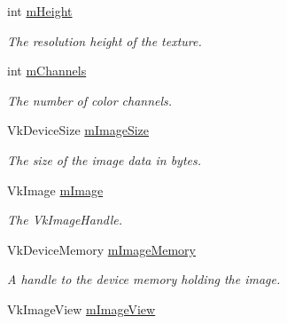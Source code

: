 \begin{DoxyCompactItemize}
\mbox{\label{class_texture_ad7078e03c0ef6e69b733eb85fd72aec2}} 
int \mbox{\hyperlink{class_texture_ad7078e03c0ef6e69b733eb85fd72aec2}{m\+Height}}
\begin{DoxyCompactList}\small\item\em The resolution height of the texture. \end{DoxyCompactList}\item 
\mbox{\label{class_texture_a45ab34f201e8555b754d643e842324cf}} 
int \mbox{\hyperlink{class_texture_a45ab34f201e8555b754d643e842324cf}{m\+Channels}}
\begin{DoxyCompactList}\small\item\em The number of color channels. \end{DoxyCompactList}\item 
\mbox{\label{class_texture_a16095fcfe6a0297defb8199d3fdecfcf}} 
Vk\+Device\+Size \mbox{\hyperlink{class_texture_a16095fcfe6a0297defb8199d3fdecfcf}{m\+Image\+Size}}
\begin{DoxyCompactList}\small\item\em The size of the image data in bytes. \end{DoxyCompactList}\item 
\mbox{\label{class_texture_a0117e52f6fca5863d2a62942809c5751}} 
Vk\+Image \mbox{\hyperlink{class_texture_a0117e52f6fca5863d2a62942809c5751}{m\+Image}}
\begin{DoxyCompactList}\small\item\em The Vk\+Image\+Handle. \end{DoxyCompactList}\item 
\mbox{\label{class_texture_a5ec4d26cbfd286764b8f1d664a067ff1}} 
Vk\+Device\+Memory \mbox{\hyperlink{class_texture_a5ec4d26cbfd286764b8f1d664a067ff1}{m\+Image\+Memory}}
\begin{DoxyCompactList}\small\item\em A handle to the device memory holding the image. \end{DoxyCompactList}\item 
\mbox{\label{class_texture_a94e2dabb32c54d68a5beee63f84b5c6e}} 
Vk\+Image\+View \mbox{\hyperlink{class_texture_a94e2dabb32c54d68a5beee63f84b5c6e}{m\+Image\+View}}

\end{DoxyCompactItemize}
